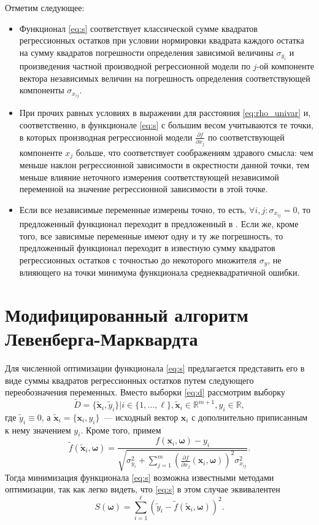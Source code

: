 \documentclass[tikz,11pt,a4paper]{article}
\newcommand{\bomega}{\boldsymbol{\omega}}
\begin{document}
Отметим следующее:
\begin{itemize}
  \item Функционал \eqref{eq:s} соответствует классической сумме квадратов регрессионных
	остатков при условии нормировки квадрата каждого остатка на сумму квадратов погрешности
	определения зависимой величины $\sigma_{y_i}$ и произведения частной производной
	регрессионной модели по $j$-ой компоненте вектора независимых величин на погрешность
	определения соответствующей компоненты $\sigma_{x_{ij}}$.

  \item При прочих равных условиях в выражении для расстояния \eqref{eq:rho_univar} и,
	соответственно, в функционале \eqref{eq:s} с большим весом учитываются те точки, в которых
	производная регрессионной модели $\frac{\partial f}{\partial x_j}$ по соответствующей
	компоненте $x_j$ больше, что соответствует соображениям здравого смысла: чем меньше наклон
	регрессионной зависимости в окрестности данной точки, тем меньше влияние неточного
	измерения соответствующей независимой переменной на значение регрессионной зависимости
	в этой точке.

  \item Если все независимые переменные измерены точно, то есть,
	$\forall i, j : \sigma_{x_{ij}} = 0$, то предложенный функционал переходит в предложенный
	в \cite{jukic2013nonlinear}. Если же, кроме того, все зависимые переменные имеют одну и ту же погрешность,
	то предложенный функционал переходит в известную сумму квадратов регрессионных остатков
	с точностью до некоторого множителя $\sigma_y$, не влияющего на точки минимума функционала
	среднеквадратичной ошибки.
\end{itemize}

\section{Модифицированный алгоритм Левенберга-Марквардта}

Для численной оптимизации функционала \eqref{eq:s} предлагается представить его в виде
суммы квадратов регрессионных остатков путем следующего переобозначения переменных.
Вместо выборки \eqref{eq:d}
рассмотрим выборку
\[
  \tilde{D} = \{ \tilde{\mathbf{x}}_i, \tilde{y}_i \} | i \in \{ 1, \dots, \ell \}, \tilde{\mathbf{x}}_i \in \mathbb{R}^{m + 1}, y_i \in \mathbb{R},
\]
где $\tilde{y}_i \equiv 0$, а
$\tilde{\mathbf{x}}_i = \{ \mathbf{x}_i, y_i \}$~--- исходный вектор $\mathbf{x}_i$
с дополнительно приписанным к нему значением $y_i$. Кроме того, примем
\[
  \tilde{f}(\tilde{\mathbf{x}}_i, \bomega) = \frac{f(\mathbf{x}_i, \bomega) - y_i}{\sqrt{\sigma_{y_i}^2 + \sum_{j = 1}^m (\frac{\partial f}{\partial x_j}(\mathbf{x}_i, \bomega))^2 \sigma^2_{x_{ij}}}}.
\]
Тогда минимизация функционала \eqref{eq:s} возможна известными методами оптимизации, так
как легко видеть, что \eqref{eq:s} в этом случае эквивалентен
\[
  S(\bomega) = \sum_{i = 1}^\ell (\tilde{y}_i - \tilde{f}(\tilde{\mathbf{x}}_i, \bomega))^2.
\]
\end{document}
